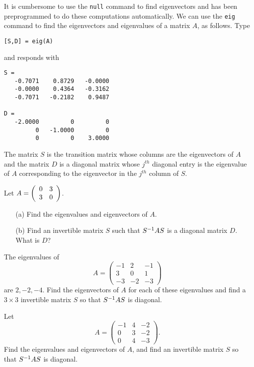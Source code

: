 It is cumbersome to use the 
{\tt null} command to find 
eigenvectors and \Matlab has been preprogrammed to do these
computations automatically.  We can use the {\tt eig} command 
to find the eigenvectors and eigenvalues of a matrix $A$, as 
follows.  Type
\begin{verbatim}
[S,D] = eig(A)
\end{verbatim}
and \Matlab responds with 
\begin{verbatim}
S =
   -0.7071    0.8729   -0.0000
   -0.0000    0.4364   -0.3162
   -0.7071   -0.2182    0.9487
 
D = 
   -2.0000         0         0
         0   -1.0000         0
         0         0    3.0000
\end{verbatim}
The matrix $S$ is the transition matrix 
whose columns are the 
eigenvectors of $A$ and the matrix $D$ is a diagonal matrix whose 
$j^{th}$ diagonal entry is the eigenvalue of $A$ corresponding to 
the eigenvector in the $j^{th}$ column of $S$.


\EXER

\TEXER

\begin{exercise} \label{c10.3.1}
Let $A=\left(\begin{array}{rr} 0 & 3\\ 3 &0\end{array}\right)$.  
\begin{itemize}
\item[(a)]  Find the eigenvalues and eigenvectors of $A$.
\item[(b)]  Find an invertible matrix $S$ such that $S^{-1} AS$ is a 
diagonal matrix $D$.  What is $D$?
\end{itemize}
\end{exercise}

\begin{exercise} \label{c10.3.2}
The eigenvalues of 
\[
A=\left(\begin{array}{rrr} -1 & 2 & -1\\ 3& 0 & 1 \\ -3 & -2 & -3 \end{array}
\right)
\]
are $2,-2,-4$.  Find the eigenvectors of $A$ for each of these eigenvalues and 
find a $3\times 3$ invertible matrix $S$ so that $S^{-1} AS$ is diagonal.
\end{exercise} 

\begin{exercise} \label{c10.3.3}
Let
\[
A=\left(\begin{array}{rrr} -1 & 4 & -2 \\ 0 & 3 & -2 \\ 0 & 4 & -3 \end{array}
\right).
\]
Find the eigenvalues and eigenvectors of $A$, and find an invertible  
matrix $S$ so that $S^{-1} AS$ is diagonal.
\end{exercise}


